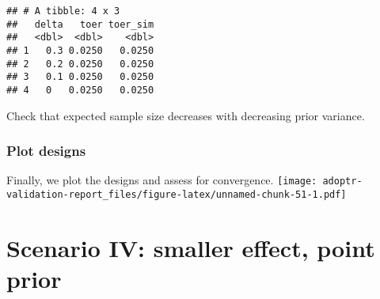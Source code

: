 \documentclass[]{book}
\newenvironment{Shaded}{\begin{snugshade}}{\end{snugshade}}
\newcommand{\DecValTok}[1]{\textcolor[rgb]{0.00,0.00,0.81}{#1}}
\newcommand{\KeywordTok}[1]{\textcolor[rgb]{0.13,0.29,0.53}{\textbf{#1}}}
\newcommand{\NormalTok}[1]{#1}
\newcommand{\OperatorTok}[1]{\textcolor[rgb]{0.81,0.36,0.00}{\textbf{#1}}}
\begin{document}
\begin{verbatim}
## # A tibble: 4 x 3
##   delta   toer toer_sim
##   <dbl>  <dbl>    <dbl>
## 1   0.3 0.0250   0.0250
## 2   0.2 0.0250   0.0250
## 3   0.1 0.0250   0.0250
## 4   0   0.0250   0.0250
\end{verbatim}

Check that expected sample size decreases with decreasing prior variance.

\begin{Shaded}
\end{Shaded}

\hypertarget{plot-designs}{%
\subsection{Plot designs}\label{plot-designs}}

Finally, we plot the designs and assess for convergence.
\texttt{[image: adoptr-validation-report\_files/figure-latex/unnamed-chunk-51-1.pdf]}

\hypertarget{scenarioIV}{%
\chapter{Scenario IV: smaller effect, point prior}\label{scenarioIV}}
\end{document}
